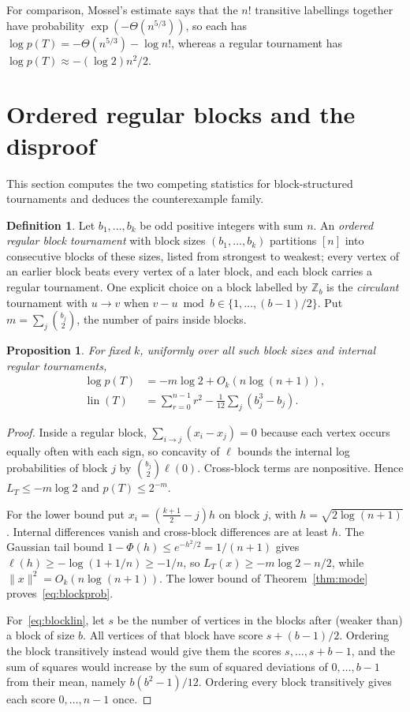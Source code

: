 \documentclass[11pt,a4paper]{article}
\newtheorem{proposition}[theorem]{Proposition}
\theoremstyle{definition}
\newtheorem{definition}[theorem]{Definition}
\DeclareMathOperator{\lin}{lin}
\begin{document}
For comparison, Mossel's estimate \cite{Mossel2010} says that the $n!$ transitive labellings together have probability $\exp(-\Theta(n^{5/3}))$, so each has $\log p(T)=-\Theta(n^{5/3})-\log n!$, whereas a regular tournament has $\log p(T)\approx-(\log 2)n^2/2$.

\section{Ordered regular blocks and the disproof}\label{sec:blocks}

This section computes the two competing statistics for block-structured tournaments and deduces the counterexample family.

\begin{definition}
Let $b_1,\ldots,b_k$ be odd positive integers with sum $n$. An \emph{ordered regular block tournament} with block sizes $(b_1,\dots,b_k)$ partitions $[n]$ into consecutive blocks of these sizes, listed from strongest to weakest; every vertex of an earlier block beats every vertex of a later block, and each block carries a regular tournament. One explicit choice on a block labelled by $\mathbb Z_b$ is the \emph{circulant} tournament with $u\to v$ when $v-u\bmod b\in\{1,\ldots,(b-1)/2\}$. Put $m=\sum_j\binom{b_j}{2}$, the number of pairs inside blocks.
\end{definition}

\begin{proposition}\label{thm:blocks}
For fixed $k$, uniformly over all such block sizes and internal regular tournaments,
\begin{align}
 \log p(T)&=-m\log 2+O_k(n\log(n+1)),\label{eq:blockprob}\\
 \lin(T)&=\sum_{r=0}^{n-1}r^2-\frac1{12}\sum_j(b_j^3-b_j).\label{eq:blocklin}
\end{align}
\end{proposition}

\begin{proof}
Inside a regular block, $\sum_{i\to j}(x_i-x_j)=0$ because each vertex occurs equally often with each sign, so concavity of $\ell$ bounds the internal log probabilities of block $j$ by $\binom{b_j}{2}\ell(0)$. Cross-block terms are nonpositive. Hence $L_T\le -m\log 2$ and $p(T)\le 2^{-m}$.

For the lower bound put $x_i=(\frac{k+1}{2}-j)h$ on block $j$, with $h=\sqrt{2\log(n+1)}$. Internal differences vanish and cross-block differences are at least $h$. The Gaussian tail bound $1-\Phi(h)\le e^{-h^2/2}=1/(n+1)$ gives $\ell(h)\ge -\log(1+1/n)\ge-1/n$, so $L_T(x)\ge-m\log 2-n/2$, while $\|x\|^2=O_k(n\log(n+1))$. The lower bound of Theorem~\ref{thm:mode} proves~\eqref{eq:blockprob}.

For~\eqref{eq:blocklin}, let $s$ be the number of vertices in the blocks after (weaker than) a block of size $b$. All vertices of that block have score $s+(b-1)/2$. Ordering the block transitively instead would give them the scores $s,\ldots,s+b-1$, and the sum of squares would increase by the sum of squared deviations of $0,\ldots,b-1$ from their mean, namely $b(b^2-1)/12$. Ordering every block transitively gives each score $0,\dots,n-1$ once.
\end{proof}
\end{document}
